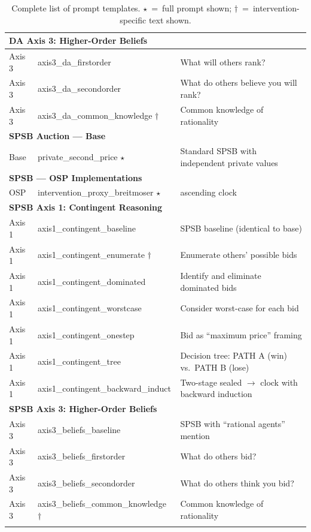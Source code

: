 \begin{longtable}{p{3.2cm} p{4.8cm} p{5.5cm}}
\multicolumn{3}{l}{\textbf{DA Axis 3: Higher-Order Beliefs}} \\
\midrule
Axis 3 & axis3\_da\_firstorder & What will others rank? \\
Axis 3 & axis3\_da\_secondorder & What do others believe you will rank? \\
Axis 3 & axis3\_da\_common\_knowledge $\dagger$ & Common knowledge of rationality \\
\midrule

\multicolumn{3}{l}{\textbf{SPSB Auction --- Base}} \\
\midrule
Base & private\_second\_price $\star$ & Standard SPSB with independent private values \\
\midrule

\multicolumn{3}{l}{\textbf{SPSB --- OSP Implementations \citep{breitmoser2022obviousness}}} \\
\midrule
OSP & intervention\_proxy\_breitmoser $\star$ & ascending clock \\

\midrule

\multicolumn{3}{l}{\textbf{SPSB Axis 1: Contingent Reasoning}} \\
\midrule
Axis 1 & axis1\_contingent\_baseline & SPSB baseline (identical to base) \\
Axis 1 & axis1\_contingent\_enumerate $\dagger$ & Enumerate others' possible bids \\
Axis 1 & axis1\_contingent\_dominated & Identify and eliminate dominated bids \\
Axis 1 & axis1\_contingent\_worstcase & Consider worst-case for each bid \\
Axis 1 & axis1\_contingent\_onestep & Bid as ``maximum price'' framing \\
Axis 1 & axis1\_contingent\_tree & Decision tree: PATH A (win) vs.\ PATH B (lose) \\
Axis 1 & axis1\_contingent\_backward\_induct & Two-stage sealed $\to$ clock with backward induction \\
\midrule

\multicolumn{3}{l}{\textbf{SPSB Axis 3: Higher-Order Beliefs}} \\
\midrule
Axis 3 & axis3\_beliefs\_baseline & SPSB with ``rational agents'' mention \\
Axis 3 & axis3\_beliefs\_firstorder & What do others bid? \\
Axis 3 & axis3\_beliefs\_secondorder & What do others think you bid? \\
Axis 3 & axis3\_beliefs\_common\_knowledge $\dagger$ & Common knowledge of rationality \\

\bottomrule
\caption{Complete list of prompt templates. $\star$~=~full prompt shown; $\dagger$~=~intervention-specific text shown.}
\label{tab:all-interventions}
\end{longtable}




